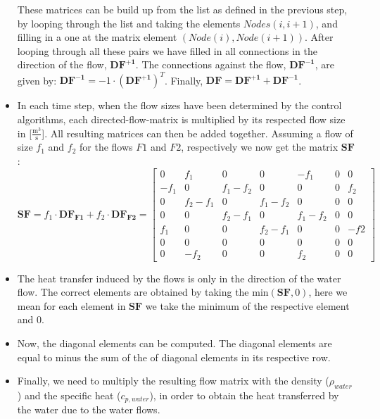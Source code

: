 \begin{itemize}
These matrices can be build up from the list as defined in the previous step, by looping through the list and taking the elements $Nodes(i,i+1)$, and filling in a one at the matrix element $(Node(i), Node(i+1))$. After looping through all these pairs we have filled in all connections in the direction of the flow, $\mathbf{DF^{+1}}$. The connections against the flow, $\mathbf{DF^{-1}}$, are given by: $\mathbf{DF^{-1}} = -1 \cdot (\mathbf{DF^{+1}})^T$. Finally, $\mathbf{DF} = \mathbf{DF^{+1}} + \mathbf{DF^{-1}}$. 
\item In each time step, when the flow sizes have been determined by the control algorithms, each directed-flow-matrix is multiplied by its respected flow size in [$\frac{\text{m}^3}{\text{s}}$]. All resulting matrices can then be added together. Assuming a flow of size $f_1$ and $f_2$ for the flows $F1$ and $F2$, respectively we now get the matrix $\mathbf{SF}$:
\begin{equation}
		\mathbf{SF} = f_1 \cdot \mathbf{DF_{F1}} + f_2 \cdot \mathbf{DF_{F2}} = \begin{bmatrix}
							0   & f_1    & 0       & 0       & -f_1    & 0 & 0 \\
							-f_1& 0      & f_1-f_2 & 0       & 0       & 0 & f_2 \\
							0   & f_2-f_1& 0       & f_1-f_2 & 0       & 0 & 0 \\
							0   & 0      & f_2-f_1 & 0       & f_1-f_2 & 0 & 0 \\
							f_1 & 0      & 0       & f_2-f_1 & 0       & 0 & -f2 \\
							0   & 0      & 0       & 0       & 0       & 0 & 0 \\
							0   & -f_2   & 0       & 0       & f_2     & 0 & 0 
							\end{bmatrix}
	\label{eq:addflows}
	\end{equation}
\item The heat transfer induced by the flows is only in the direction of the water flow. The correct elements are obtained by taking the $\text{min}(\mathbf{SF},0)$, here we mean for each element in $\mathbf{SF}$ we take the minimum of the respective element and 0. 
\item Now, the diagonal elements can be computed. The diagonal elements are equal to minus the sum of the of diagonal elements in its respective row. 

\item Finally, we need to multiply the resulting flow matrix with the density ($\rho_{water}$) and the specific heat ($c_{p, water}$), in order to obtain the heat transferred by the water due to the water flows. 
\end{itemize} 


